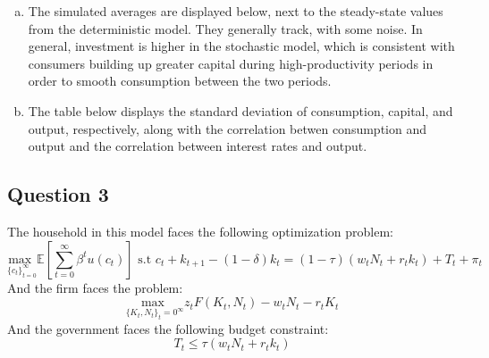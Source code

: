\documentclass{article}
\newcommand{\usmax}[1]{\underset{#1}{\text{max }}}
\newcommand{\E}[1]{\mathbb{E}\left[#1\right]} %
\begin{document}
\begin{enumerate}[(a)]
	\item The simulated averages are displayed below, next to the steady-state values from the deterministic model. They generally track, with some noise. In general, investment is higher in the stochastic model, which is consistent with consumers building up greater capital during high-productivity periods in order to smooth consumption between the two periods.
		
	
	
	\item The table below displays the standard deviation of consumption, capital, and output, respectively, along with the correlation betwen consumption and output and the correlation between interest rates and output.
		
	
	
\end{enumerate}

\pagebreak
\subsection*{Question 3}
The household in this model faces the following optimization problem:
\[
	\usmax{\{c_t\}_{t=0}^\infty}\E{\sum_{t=0}^\infty \beta^tu(c_t)}\text{ s.t }c_t + k_{t+1} - (1-\delta)k_t = (1-\tau)\left(w_tN_t + r_tk_t\right) + T_t + \pi_t
\]
And the firm faces the problem:
\[
	\usmax{\{K_t,N_t\}_t=0^\infty}z_tF(K_t,N_t) - w_tN_t - r_tK_t
\]
And the government faces the following budget constraint:
\[
	T_t \leq \tau(w_tN_t + r_tk_t)
\]
\end{document}
